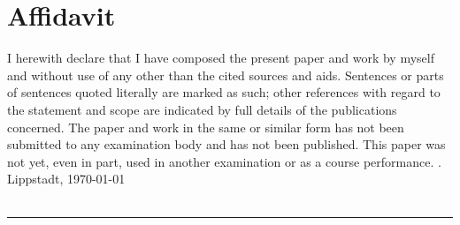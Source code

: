 
\pagestyle{fancy}










\newpage
\lhead{}
\rhead{\leftmark}





\listoffigures				%
\listoftables				%

\chapter*{Affidavit}
I \myauthor herewith declare that I have composed the present paper and work by myself and without use of any other than the cited sources and aids. Sentences or parts of sentences quoted literally are marked as such; other references with regard to the statement and scope are indicated by full details of the publications concerned. The paper and work in the same or similar form has not been submitted to any examination body and has not been published. This paper was not yet, even in part, used in another examination or as a course performance.
. ~\\
Lippstadt,  \today\\[.6cm] %
\myauthor\\ %
\rule[0.5em]{20em}{0.5pt}

\appendix




